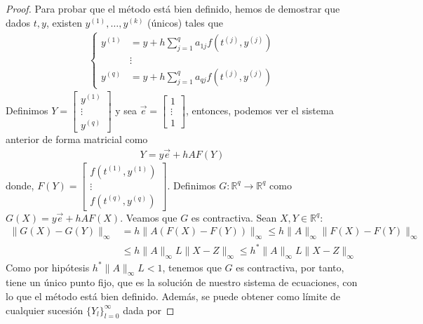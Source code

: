 \begin{proof}
    Para probar que el método está bien definido, hemos de demostrar que dados $t,y$, existen $y^{(1)},\ldots,y^{(k)}$ (únicos) tales que
    \begin{align*}
        \left\{ \begin{array}{lcc}
                    y^{(1)} & = y + h\sum_{j=1}^{q}a_{1j}f(t^{(j)},y^{(j)}) \\
                            & \vdots                                        \\
                    y^{(q)} & = y + h\sum_{j=1}^{q}a_{qj}f(t^{(j)},y^{(j)})
                \end{array}
        \right.
    \end{align*}
    Definimos $Y = \begin{bmatrix}
            y^{(1)} \\
            \vdots  \\
            y^{(q)}
        \end{bmatrix}$ y sea $\overrightarrow{e} = \begin{bmatrix}
            1      \\
            \vdots \\
            1
        \end{bmatrix}$, entonces, podemos ver el sistema anterior de forma matricial como
    \begin{align*}
        Y = y\overrightarrow{e} + hAF(Y)
    \end{align*}
    donde, $F(Y) = \begin{bmatrix}
            f(t^{(1)}, y^{(1)}) \\
            \vdots              \\
            f(t^{(q)},y^{(q)})
        \end{bmatrix}$. Definimos $G: \mathbb{R}^q \longrightarrow \mathbb{R}^q$ como $G(X) = y\overrightarrow{e} + hAF(X)$. Veamos que $G$ es contractiva. Sean $X,Y \in \mathbb{R}^q$:
    \begin{align*}
        \|G(X) - G(Y)\|_{\infty} & = h\|A(F(X) - F(Y))\|_{\infty} \leq h\|A\|_{\infty}\|F(X) - F(Y)\|_{\infty}   \\
                                 & \leq h\|A\|_{\infty}L\|X-Z\|_{\infty} \leq h^*\|A\|_{\infty}L\|X-Z\|_{\infty}
    \end{align*}
    Como por hipótesis $h^*\|A\|_{\infty}L < 1$, tenemos que $G$ es contractiva, por tanto, tiene un único punto fijo, que es la solución de nuestro sistema de ecuaciones, con lo que el método está bien definido. Además, se puede obtener como límite de cualquier sucesión $\{Y_l\}_{l=0}^{\infty}$ dada por

\end{proof}
